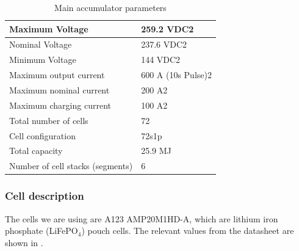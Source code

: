 \documentclass{article}
\begin{document}
	\begin{table}[H]
	    \centering
	    \begin{tabular}{|l|l|}
	        \hline
	        Maximum Voltage & 259.2 VDC2 \\ \hline
	        Nominal Voltage & 237.6 VDC2 \\ \hline
	        Minimum Voltage & 144 VDC2 \\ \hline
	        Maximum output current & 600 A (10s Pulse)2 \\ \hline
	        Maximum nominal current & 200 A2 \\ \hline
	        Maximum charging current & 100 A2 \\ \hline
	        Total number of cells & 72 \\ \hline
	        Cell configuration & 72s1p \\ \hline
	        Total capacity & 25.9 MJ \\ \hline
	        Number of cell stacks (segments) & 6 \\ \hline
	    \end{tabular}
	    \caption{Main accumulator parameters}
	    \label{tab:batterytable}
	\end{table}

\subsubsection{Cell description}\label{accumulator_cell_description}

The cells we are using are A123 AMP20M1HD-A, which are lithium iron phosphate (LiFePO$_4$) pouch cells. The relevant values from the datasheet are shown in .
\end{document}

